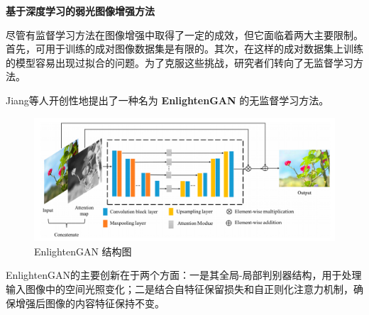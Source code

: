 \documentclass[CJK,aspectratio=169]{beamer}  %
\begin{document}
	\begin{frame}
	{ \yahei \textbf{基于深度学习的弱光图像增强方法}}
	
	{ \yahei 尽管有监督学习方法在图像增强中取得了一定的成效，但它面临着两大主要限制。首先，可用于训练的成对图像数据集是有限的。其次，在这样的成对数据集上训练的模型容易出现过拟合的问题。为了克服这些挑战，研究者们转向了无监督学习方法。}
	
	{ \yahei Jiang等人\textcolor{blue}{\citep{jiang2021enlightengan}}开创性地提出了一种名为 \textbf{EnlightenGAN} 的无监督学习方法。}
	
	\begin{figure}
		\centering
		\setlength{\abovecaptionskip}{-0.05cm}
		\begin{minipage}{.6\columnwidth}
			\includegraphics[width=\columnwidth]{picture/LLIE/EnlightenGAN/EnlightenGAN}
			\caption{
				\label{fig: EnlightenGAN Architecture} 
				\tiny EnlightenGAN 结构图
			}
		\end{minipage}
	\end{figure}
	
	{ \yahei EnlightenGAN的主要创新在于两个方面：一是其全局-局部判别器结构，用于处理输入图像中的空间光照变化；二是结合自特征保留损失和自正则化注意力机制，确保增强后图像的内容特征保持不变。}
	
	\end{frame}
	
\end{document}
